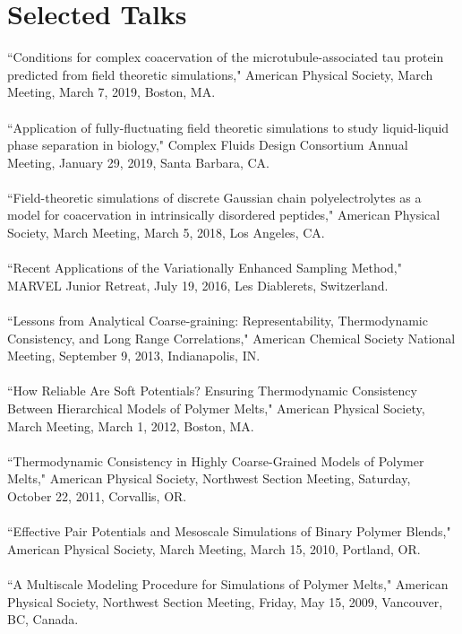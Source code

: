 \documentclass[10pt]{article} %
\begin{document}
\section{Selected Talks}
``Conditions for complex coacervation of the microtubule-associated tau protein predicted from field theoretic simulations," American Physical Society, March Meeting, March 7, 2019, Boston, MA.\\
\\
``Application of fully-fluctuating field theoretic simulations to study liquid-liquid phase separation in biology," Complex Fluids Design Consortium Annual Meeting, January 29, 2019, Santa Barbara, CA.\\
\\
``Field-theoretic simulations of discrete Gaussian chain polyelectrolytes as a model for coacervation in intrinsically disordered peptides," American Physical Society, March Meeting, March 5, 2018, Los Angeles, CA.\\
\\
``Recent Applications of the Variationally Enhanced Sampling Method," MARVEL Junior Retreat, July 19, 2016, Les Diablerets, Switzerland. \\
\\
``Lessons from Analytical Coarse-graining: Representability, Thermodynamic Consistency, and Long Range Correlations," American Chemical Society National Meeting, September 9, 2013, Indianapolis, IN. \\
\\
``How Reliable Are Soft Potentials? Ensuring Thermodynamic Consistency Between Hierarchical Models of Polymer Melts," American Physical Society, March Meeting, March 1, 2012, Boston, MA. \\
\\
``Thermodynamic Consistency in Highly Coarse-Grained Models of Polymer Melts," American Physical Society, Northwest Section Meeting, Saturday, October 22, 2011, Corvallis, OR. \\
\\
``Effective Pair Potentials and Mesoscale Simulations of Binary Polymer Blends," American Physical Society, March Meeting, March 15, 2010, Portland, OR. \\
\\
``A Multiscale Modeling Procedure for Simulations of Polymer Melts," American Physical Society, Northwest Section Meeting, Friday, May 15, 2009, Vancouver, BC, Canada.

\end{document}
